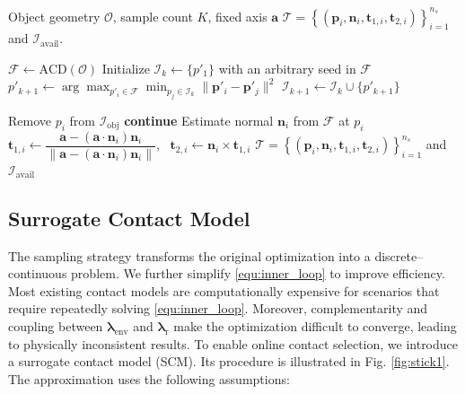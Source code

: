 \begin{algorithm}[t]
\caption{Sampling and Exchange Method}
\label{algorithm:sampling}
\begin{algorithmic}[1]
\Require Object geometry $\mathcal{O}$, sample count $K$, fixed axis $\boldsymbol{a}$
\Ensure $\mathcal{T}= \left \{ (\boldsymbol{p}_i,\boldsymbol{n}_i, \boldsymbol{t}_{1,i}, \boldsymbol{t}_{2,i}) \right \}^{n_s}_{i=1}$ and $\mathcal{I}_{\text{avail}}$.

\State $\mathcal{F} \gets \text{ACD}(\mathcal{O})$ 
\State Initialize $\mathcal{I}_{k} \gets \{p'_1\}$ with an arbitrary seed in $\mathcal{F}$
 \State $p'_{k+1} \gets \arg\max_{p'_i\in \mathcal{F}} \min_{p_j\in \mathcal{I}_{k}} \|\boldsymbol{p}'_i-\boldsymbol{p}'_j\|^2$
 \State $\mathcal{I}_{k+1} \gets \mathcal{I}_{k} \cup \{p'_{k+1}\}$ 
\EndFor

\State {} 
 \State Remove $p_i$ from $\mathcal{I}_{\text{obj}}$ 
 \State \textbf{continue}
 \EndIf {}
 \State Estimate normal $\boldsymbol{n}_i$ from $\mathcal{F}$ at $p_i$
 \State $\boldsymbol{t}_{1,i} \gets \dfrac{\boldsymbol{a}-(\boldsymbol{a}\cdot\boldsymbol{n}_i)\boldsymbol{n}_i}{\|\boldsymbol{a}-(\boldsymbol{a}\cdot\boldsymbol{n}_i)\boldsymbol{n}_i\|}$, \ $\boldsymbol{t}_{2,i} \gets \boldsymbol{n}_i \times \boldsymbol{t}_{1,i}$
\EndFor
\State \Return $\mathcal{T}=\left \{ (\boldsymbol{p}_i,\boldsymbol{n}_i, \boldsymbol{t}_{1,i}, \boldsymbol{t}_{2,i}) \right \}^{n_s}_{i=1}$ and $\mathcal{I}_{\text{avail}}$
\end{algorithmic}
\end{algorithm}

\subsection{Surrogate Contact Model}

The sampling strategy transforms the original optimization into a discrete–continuous problem. We further simplify \eqref{equ:inner_loop} to improve efficiency. Most existing contact models are computationally expensive for scenarios that require repeatedly solving \eqref{equ:inner_loop}. Moreover, complementarity and coupling between $\boldsymbol{\lambda}_{\text{env}}$ and $\boldsymbol{\lambda}_{\text{r}}$ make the optimization difficult to converge, leading to physically inconsistent results. To enable online contact selection, we introduce a surrogate contact model (SCM). Its procedure is illustrated in Fig. \ref{fig:stick1}. The approximation uses the following assumptions:

